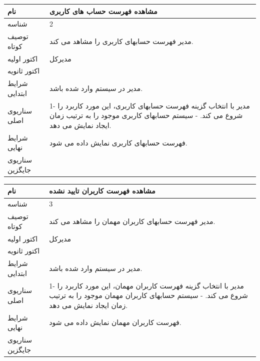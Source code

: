 \vspace{2cm}


\begin{tabular}{|p{2cm}|p{10cm}|}
\hline
نام
&
مشاهده فهرست حساب های کاربری
\\
\hline
شناسه
&
2
\\
\hline
توصیف کوتاه
&
مدیر فهرست حسابهای کاربری را مشاهد می کند.
\\
\hline
اکتور اولیه
&
مدیرکل
\\
\hline
اکتور ثانویه
&

\\
\hline
شرایط ابتدایی
&
مدیر در سیستم وارد شده باشد.
\\
\hline
سناریوی اصلی
&
1-	مدیر با انتخاب گزینه فهرست حسابهای کاربری، این مورد کاربرد را شروع می کند.
\newline
2-	سیستم حسابهای کاربری موجود را به ترتیب زمان ایجاد نمایش می دهد.
\\
\hline
شرایط نهایی
&
فهرست حسابهای کاربری نمایش داده می شود.
\\
\hline
سناریوی جایگزین
&

\\
\hline
\end{tabular}

\vspace{2cm}


\begin{tabular}{|p{2cm}|p{10cm}|}
\hline
نام
&
مشاهده فهرست کاربران تایید نشده
\\
\hline
شناسه
&
3
\\
\hline
توصیف کوتاه
&
مدیر فهرست حسابهای کاربران مهمان را مشاهد می کند.
\\
\hline
اکتور اولیه
&
مدیرکل
\\
\hline
اکتور ثانویه
&

\\
\hline
شرایط ابتدایی
&
مدیر در سیستم وارد شده باشد.
\\
\hline
سناریوی اصلی
&
1-	مدیر با انتخاب گزینه فهرست کاربران مهمان، این مورد کاربرد را شروع می کند.
\newline
2-	سیستم حسابهای کاربران مهمان موجود را به ترتیب زمان ایجاد نمایش می دهد.
\\
\hline
شرایط نهایی
&
فهرست کاربران مهمان نمایش داده می شود.
\\
\hline
سناریوی جایگزین
&

\\
\hline
\end{tabular}

\vspace{2cm}


